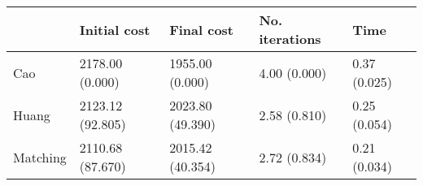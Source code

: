 \begin{tabular}{lllll}
\toprule
{} &      Initial cost &        Final cost & No. iterations &          Time \\
\midrule
Cao      &   2178.00 (0.000) &   1955.00 (0.000) &   4.00 (0.000) &  0.37 (0.025) \\
Huang    &  2123.12 (92.805) &  2023.80 (49.390) &   2.58 (0.810) &  0.25 (0.054) \\
Matching &  2110.68 (87.670) &  2015.42 (40.354) &   2.72 (0.834) &  0.21 (0.034) \\
\bottomrule
\end{tabular}
